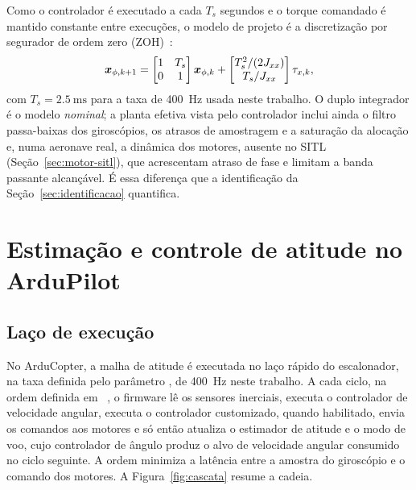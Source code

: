 Como o controlador é executado a cada $T_s$ segundos e o torque comandado é
mantido constante entre execuções, o modelo de projeto é a discretização por
segurador de ordem zero (ZOH)~\cite{franklin1998}:
\begin{equation}
\bm{x}_{\phi,k+1} =
\begin{bmatrix} 1 & T_s \\ 0 & 1 \end{bmatrix} \bm{x}_{\phi,k} +
\begin{bmatrix} T_s^2/(2J_{xx}) \\ T_s/J_{xx} \end{bmatrix} \tau_{x,k},
\label{eq:discreto}
\end{equation}
com $T_s = \SI{2.5}{\milli\second}$ para a taxa de \SI{400}{\hertz} usada
neste trabalho. O duplo integrador é o modelo \emph{nominal}; a planta efetiva
vista pelo controlador inclui ainda o filtro passa-baixas dos giroscópios, os
atrasos de amostragem e a saturação da alocação e, numa aeronave real, a
dinâmica dos motores, ausente no SITL (Seção~\ref{sec:motor-sitl}), que
acrescentam atraso de fase e limitam a banda passante alcançável. É essa
diferença que a identificação da Seção~\ref{sec:identificacao} quantifica.

\section{Estimação e controle de atitude no ArduPilot}
\label{sec:ardupilot}

\subsection{Laço de execução}

No ArduCopter, a malha de atitude é executada no laço rápido do escalonador,
na taxa definida pelo parâmetro , de
\SI{400}{\hertz} neste trabalho. A cada ciclo, na ordem definida em
~\cite{ardupilot2026}, o firmware lê os sensores
inerciais, executa o controlador de velocidade angular, executa o controlador
customizado, quando habilitado, envia os comandos aos motores e só então
atualiza o estimador de atitude e o modo de voo, cujo controlador de ângulo
produz o alvo de velocidade angular consumido no ciclo seguinte. A ordem
minimiza a latência entre a amostra do giroscópio e o comando dos motores. A
Figura~\ref{fig:cascata} resume a cadeia.

